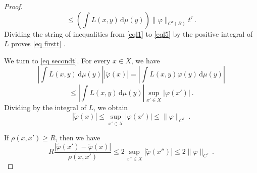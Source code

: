 \begin{proof}
    \begin{equation}\label{eql5}
            \le   \left(\int L(x,y) \, \mathrm{d}\mu(y)\right)
            \|\varphi\|_{C^\tau(B)} t^{\tau} \, .
    \end{equation}
    Dividing the string of inequalities from \eqref{eql1} to
\eqref{eql5} by the positive integral of $L$ proves \eqref{eq firstt} .


We turn to \eqref{eq secondt}. For every $x\in X$, we have
\begin{equation}
    \left|\int L(x,y) \, \mathrm{d}\mu(y)\right||\tilde{\varphi}(x)|
    =\left|\int L(x,y) {\varphi}(y)\, \mathrm{d}\mu(y)\right|
\end{equation}
    \begin{equation}
    \le \left|\int L(x,y) \, \mathrm{d}\mu(y)\right| \sup_{x'\in X}
    |{\varphi}(x')|\ .
\end{equation}
Dividing by the integral of $L$, we obtain
\begin{equation}\label{eql42}
    |\tilde{\varphi}(x)|\le \sup_{x'\in X}
    |{\varphi}(x')|\le \|\varphi\|_{C^\tau}\ .
\end{equation}

If $\rho(x,x')\ge R$, then we have
    \begin{equation}\label{eql52}
    R\frac{|\tilde{\varphi}(x') - \tilde \varphi(x)|}{\rho(x,x')} \le
    2\sup_{x''\in X} |\tilde{\varphi}(x'')|\le 2\|\varphi\|_{C^\tau}\, .
\end{equation}


\end{proof}
